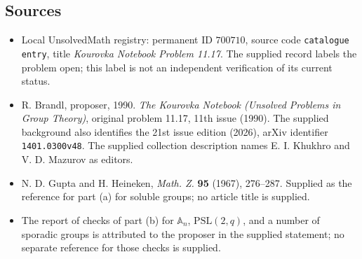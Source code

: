 \documentclass[11pt]{article}
\begin{document}
\subsection{Sources}
\begin{itemize}
\item Local UnsolvedMath registry: permanent ID \(700710\), source code \texttt{catalogue entry}, title \emph{Kourovka Notebook Problem 11.17}. The supplied record labels the problem open; this label is not an independent verification of its current status.
\item R. Brandl, proposer, 1990. \emph{The Kourovka Notebook (Unsolved Problems in Group Theory)}, original problem 11.17, 11th issue (1990). The supplied background also identifies the 21st issue edition (2026), arXiv identifier \texttt{1401.0300v48}. The supplied collection description names E. I. Khukhro and V. D. Mazurov as editors.
\item N. D. Gupta and H. Heineken, \emph{Math. Z.} \textbf{95} (1967), 276--287. Supplied as the reference for part (a) for soluble groups; no article title is supplied.
\item The report of checks of part (b) for \(\mathbb A_n\), \(\mathrm{PSL}(2,q)\), and a number of sporadic groups is attributed to the proposer in the supplied statement; no separate reference for those checks is supplied.
\end{itemize}
\end{document}
